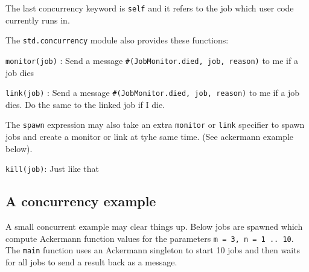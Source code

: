 The last concurrency keyword is \texttt{self} and it refers to the job
which user code currently runs in.

The \texttt{std.concurrency} module also provides these functions:

\texttt{monitor(job)} : Send a message
\texttt{\#(JobMonitor.died,\ job,\ reason)} to me if a job dies

\texttt{link(job)} : Send a message
\texttt{\#(JobMonitor.died,\ job,\ reason)} to me if a job dies. Do the
same to the linked job if I die.

The \texttt{spawn} expression may also take an extra \texttt{monitor} or
\texttt{link} specifier to spawn jobs and create a monitor or link at
tyhe same time. (See ackermann example below).

\texttt{kill(job)}: Just like that

\hypertarget{a-concurrency-example}{%
\subsection{A concurrency example}\label{a-concurrency-example}}

A small concurrent example may clear things up. Below jobs are spawned
which compute Ackermann function values for the parameters
\texttt{m\ =\ 3,\ n\ =\ 1\ ..\ 10}. The \texttt{main} function uses an
Ackermann singleton to start 10 jobs and then waits for all jobs to send
a result back as a message.

